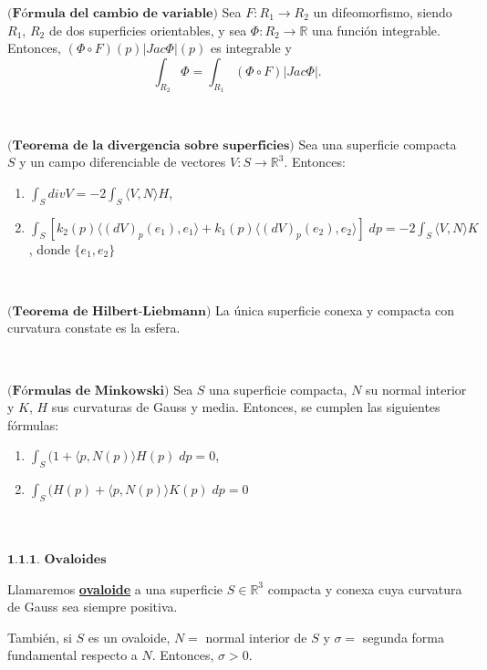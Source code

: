 \begin{teorema}
	$\textbf{(Fórmula del cambio de variable)}$ Sea $F : R_1 \to R_2$ un difeomorfismo, siendo $R_1$, $R_2$ de dos superficies orientables, y sea $\Phi : R_2 \to \mathbb{R}$ una función integrable. Entonces, $(\Phi \circ F)(p)|Jac \Phi|(p)$ es integrable y
	\[
	\int_{R_2} \Phi = \int_{R_1} (\Phi \circ F)|Jac \Phi|.
	\]
\end{teorema}
${ }$\\

\begin{teorema}\label{teo:divergencia}
	$\textbf{(Teorema de la divergencia sobre superficies)}$ Sea una superficie compacta $S$ y un campo diferenciable de vectores $V : S \to \mathbb{R}^3$. Entonces:
	\begin{enumerate}
		\item $\int_S div V = -2 \int_S \langle V, N \rangle H$,
		\item $\int_S [k_2(p) \langle (dV)_p(e_1), e_1\rangle + k_1(p) \langle (dV)_p(e_2), e_2 \rangle ] \; dp = -2 \int_S \langle V, N \rangle K$, donde $\{ e_1, e_2 \}$
	\end{enumerate}
\end{teorema}
${ }$\\

\begin{teorema} \label{teo:hil-lie}
	$\textbf{(Teorema de Hilbert-Liebmann)}$ La única superficie conexa y compacta con curvatura constate es la esfera.
\end{teorema}
${ }$\\


\begin{teorema}
	$\textbf{(Fórmulas de Minkowski)}$ Sea $S$ una superficie compacta, $N$ su normal interior y $K$, $H$ sus curvaturas de Gauss y media. Entonces, se cumplen las siguientes fórmulas:
	\begin{enumerate}
		\item $\int_S (1 + \langle p, N(p) \rangle H(p) \; dp = 0$,
		\item $\int_S (H(p) + \langle p, N(p) \rangle K(p) \; dp = 0$
	\end{enumerate}
\end{teorema}
${ }$\\

${ }$\\
$\textbf{1.1.1. Ovaloides}$
${ }$\\

\begin{definicion}
	Llamaremos \underline{\textbf{ovaloide}} a una superficie $S \in \mathbb{R}^3$ compacta y conexa cuya curvatura de Gauss sea siempre positiva.
	
	También, si $S$ es un ovaloide, $N =$ normal interior de $S$ y $\sigma =$ segunda forma fundamental respecto a $N$. Entonces, $\sigma > 0$.
\end{definicion}
${ }$\\

